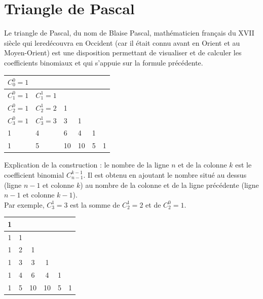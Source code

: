\documentclass[french]{book}
\newcommand{\C}[2]{C_{#1}^{#2}}
\begin{document}
\section{Triangle de Pascal}
 Le triangle de Pascal, du nom de Blaise Pascal, mathématicien français du XVII siècle qui le\og{}redécouvra\fg{} en Occident (car il était connu avant en Orient et au Moyen-Orient) est une disposition permettant de visualiser et de calculer les coefficients binomiaux et qui s'appuie sur la formule précédente.
\begin{center}
 \begin{tabular}{|p{1.5cm}|p{1.5cm}|p{1.5cm}|p{1.5cm}|p{1.5cm}|p{1.5cm}|}
\hline
  $\C{0}{0}=1$ & & & & &\\
\hline
$\C{1}{0}=1$ & $\C{1}{1}=1$ & & & &\\
\hline
$\C{2}{0}=1$ & $\C{2}{1}=2$ & 1 & & &\\
\hline
$\C{3}{0}=1$ & $\C{3}{1}=3$ & 3 & 1 & & \\
\hline
1 & 4 & 6 & 4 & 1 &\\
\hline
1 & 5 & 10 & 10 & 5 & 1\\
\hline
 \end{tabular}
\end{center}
Explication de la construction : le nombre de la ligne $n$ et de la colonne $k$ est le coefficient binomial $\C{n-1}{k-1}$. Il est obtenu en ajoutant le nombre situé au dessus (ligne $n-1$ et colonne $k$) au nombre de la colonne et de la ligne précédente (ligne $n-1$ et colonne $k-1$).\\
Par exemple, $\C{3}{1}=3$ est la somme de $\C{2}{1}=2$ et de $\C{2}{0}=1$.
\begin{center}
 \begin{tabular}{|c|c|c|c|c|c|}
\hline
  1 & & & & &\\
\hline
1 & 1 & & & &\\
\hline
1 & 2 & 1 & & &\\
\hline
1 & 3 & 3 & 1 & & \\
\hline
1 & 4 & 6 & 4 & 1 &\\
\hline
1 & 5 & 10 & 10 & 5 & 1\\
\hline
 \end{tabular}
\end{center}

\newpage

\end{document}
